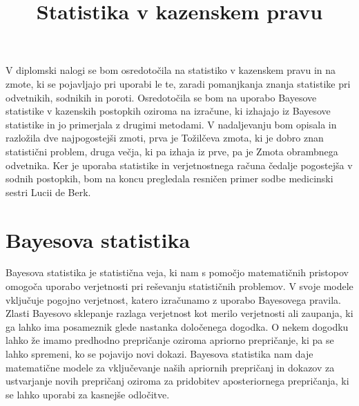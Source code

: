 \documentclass[12pt,a4paper]{amsart}
\theoremstyle{definition} %
\theoremstyle{plain} %
\begin{document}
\title{Statistika v kazenskem pravu}
\maketitle

V diplomski nalogi se bom osredotočila na statistiko v kazenskem pravu in na zmote, ki se pojavljajo pri uporabi le te, zaradi pomanjkanja
znanja statistike pri odvetnikih, sodnikih in poroti. Osredotočila se bom na uporabo Bayesove statistike v kazenskih postopkih oziroma na izračune,
ki izhajajo iz Bayesove statistike in jo primerjala z drugimi metodami. V nadaljevanju bom opisala in razložila dve najpogostejši zmoti, prva
je Tožilčeva zmota, ki je dobro znan statistični problem, druga večja, ki pa izhaja iz prve, pa je Zmota obrambnega odvetnika. Ker je uporaba
statistike in verjetnostnega računa čedalje pogostejša v sodnih postopkih, bom na koncu pregledala resničen primer sodbe medicinski sestri Lucii de Berk.

\section{Bayesova statistika}
Bayesova statistika je statistična veja, ki nam s pomočjo matematičnih pristopov omogoča uporabo verjetnosti pri reševanju statističnih
problemov. V svoje modele vključuje pogojno verjetnost, katero izračunamo z uporabo Bayesovega pravila. \\
 
Zlasti Bayesovo sklepanje razlaga verjetnost kot merilo verjetnosti ali zaupanja, ki ga lahko ima posameznik glede nastanka določenega dogodka.
O nekem dogodku lahko že imamo predhodno prepričanje oziroma apriorno prepričanje, ki pa se lahko spremeni, ko se pojavijo novi dokazi. Bayesova
statistika nam daje matematične modele za vključevanje naših apriornih prepričanj in dokazov za ustvarjanje novih prepričanj oziroma za
pridobitev aposteriornega prepričanja, ki se lahko uporabi za kasnejše odločitve.

\end{document}
